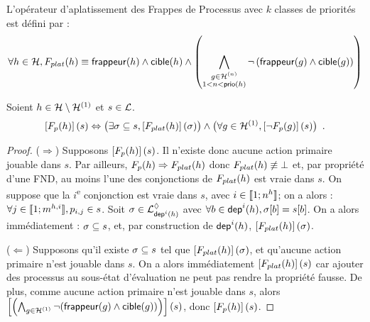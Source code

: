 
\begin{definition}
  L'opérateur d'aplatissement des Frappes de Processus avec $k$ classes de priorités
  est défini par :
  \[\forall h \in \mathcal{H}, F_{plat}(h) \equiv \mathsf{frappeur}(h) \wedge \mathsf{cible}(h) \wedge
    \left( \bigwedge_{\substack{g \in \mathcal{H}^{(n)}\\1 < n < \mathsf{prio}(h)}}
    \neg \left( \mathsf{frappeur}(g) \wedge \mathsf{cible}(g) \right) \right)\]
\end{definition}

\begin{lemma}
  Soient $h \in \mathcal{H} \setminus \mathcal{H}^{(1)}$ et $s \in \mathcal{L}$.
  \[\left[F_{p}(h)\right](s) \Leftrightarrow
    \big(\exists \sigma \subseteq s, \left[F_{plat}(h)\right](\sigma)\big)
    \wedge \big(\forall g \in \mathcal{H}^{(1)}, \left[\neg F_{p}(g)\right](s)\big)
    \enspace.\]
\end{lemma}
%
\begin{proof}
  ($\Rightarrow$)
    Supposons $\left[F_{p}(h)\right](s)$.
    Il n'existe donc aucune action primaire jouable dans $s$.
    Par ailleurs, $F_{p}(h) \Rightarrow F_{plat}(h)$ donc
    $F_{plat}(h) \not\equiv \bot$ et, par propriété d'une FND,
    au moins l'une des conjonctions de $F_{plat}(h)$ est vraie dans $s$.
    On suppose que la $i$\textsuperscript{e} conjonction est vraie dans $s$,
    avec $i \in \llbracket 1; n^{h} \rrbracket$;
    on a alors : $\forall j \in \llbracket 1; m^{h,i} \rrbracket, p_{i,j} \in s$.
    Soit $\sigma \in \mathcal{L}^\lozenge_{\mathsf{dep}^{i}(h)}$
    avec $\forall b \in \mathsf{dep}^{i}(h), {\sigma[b]} = {s[b]}$.
    On a alors immédiatement : $\sigma \subseteq s$,
    et, par construction de $\mathsf{dep}^{i}(h)$, $\left[F_{plat}(h)\right](\sigma)$.
  
  ($\Leftarrow$)
    Supposons qu'il existe $\sigma \subseteq s$ tel que $\left[F_{plat}(h)\right](\sigma)$,
    et qu'aucune action primaire n'est jouable dans $s$.
    On a alors immédiatement $\left[F_{plat}(h)\right](s)$
    car ajouter des processus au sous-état
    d'évaluation ne peut pas rendre la propriété fausse.
    De plus, comme aucune action primaire n'est jouable dans $s$, alors
    $\left[\left( \bigwedge_{g \in \mathcal{H}^{(1)}} \neg (\mathsf{frappeur}(g) \wedge \mathsf{cible}(g)) \right)\right](s)$,
    donc $\left[F_{p}(h)\right](s)$.
\end{proof}

